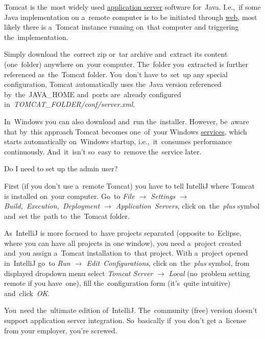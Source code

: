 \label{tomcat}
Tomcat is the~most widely used \hyperref[applicationserver]{application server} software for~Java. I.e.,~if some Java implementation on a~remote computer is to be initiated through \hyperref[internetweb]{web}, most likely there is a~Tomcat instance running on~that computer and triggering the~implementation.




Simply download the~correct zip or~tar archive and~extract its content (one~folder) anywhere on~your computer. The~folder you~extracted is further referenced as~the~Tomcat folder. You~don't have to~set~up any special configuration, Tomcat automatically uses the~Java version referenced by~the~JAVA\_HOME and~ports are~already configured in~\textit{TOMCAT\_FOLDER/conf/server.xml}.

\warning In~Windows you can also download and~run the~installer. However, be~aware that by~this approach Tomcat becomes one~of~your Windows \hyperref[applicationprocessprogramservicethread]{services}, which starts automatically on~Windows startup, i.e.,~it~consumes performance continuously. And~it~isn't so~easy to~remove the~service later.

\todo Do I need to set up the admin user?

First (if you don't use a~remote Tomcat) you have to tell IntelliJ where Tomcat is installed on~your computer. Go~to \textit{File $\rightarrow$ Settings $\rightarrow$ Build,~Execution,~Deployment $\rightarrow$ Application~Servers}, click on~the~\textit{plus} symbol and~set the~path to~the~Tomcat folder.

As~IntelliJ is more focused to~have projects separated (opposite to~Eclipse, where you can have all projects in one window), you need a~project created and~you assign a~Tomcat installation to~that project. With a~project opened in~IntelliJ go~to \textit{Run $\rightarrow$ Edit~Configurations}, click on~the~\textit{plus} symbol, from displayed dropdown menu select \textit{Tomcat Server} $\rightarrow$ \textit{Local} (no~problem setting remote if you have~one), fill the~configuration form (it's~quite intuitive) and~click~\textit{OK}.

\warning You~need the~ultimate edition of~IntelliJ. The~community (free) version doesn't support application server integration. So~basically if~you don't get a~license from your employer, you're screwed.




